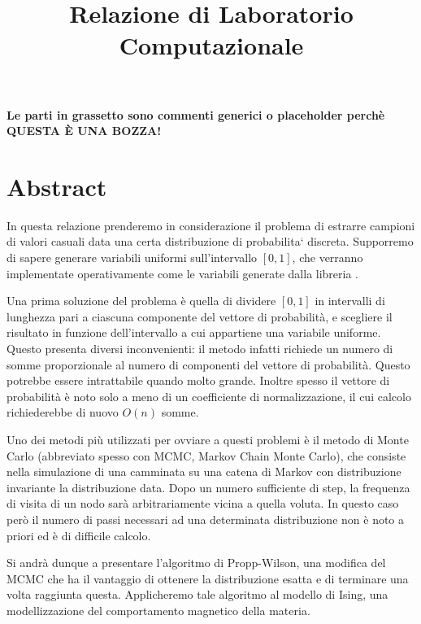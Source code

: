 \documentclass[]{marticle}
\title{\textbf{\Huge Relazione di Laboratorio Computazionale}}
\date{}
\begin{document}
\maketitle

\textbf{Le parti in grassetto sono commenti generici o placeholder perch\`e
QUESTA \`E UNA BOZZA!}

\section*{Abstract}
In questa relazione prenderemo in considerazione il problema di estrarre
campioni di valori casuali data una certa distribuzione di probabilita` discreta.
Supporremo di sapere generare variabili uniformi sull'intervallo $[0,1]$, che
verranno implementate operativamente come le variabili generate dalla libreria
.

Una prima soluzione del problema \`e quella di dividere $[0,1]$ in intervalli di
lunghezza pari a ciascuna componente del vettore di probabilit\`a, e scegliere
il risultato in funzione dell'intervallo a cui appartiene una variabile
uniforme. Questo presenta diversi inconvenienti: il metodo infatti richiede un
numero di somme proporzionale al numero di componenti del vettore di
probabilit\`a. Questo potrebbe essere intrattabile quando molto grande. Inoltre
spesso il vettore di probabilit\`a \`e noto solo a meno di un coefficiente di
normalizzazione, il cui calcolo richiederebbe di nuovo $O(n)$ somme. 

Uno dei metodi pi\`u utilizzati per ovviare a questi problemi \`e il metodo di
Monte Carlo (abbreviato spesso con MCMC, Markov Chain Monte Carlo), che consiste
nella simulazione di una camminata su una catena di Markov con distribuzione
invariante la distribuzione data. Dopo un numero sufficiente di step, la
frequenza di visita di un nodo sar\`a arbitrariamente vicina a quella voluta. In
questo caso per\`o il numero di passi necessari ad una determinata distribuzione
non \`e noto a priori ed \`e di difficile calcolo.

Si andr\`a dunque a presentare l'algoritmo di Propp-Wilson, una modifica del
MCMC che ha il vantaggio di ottenere la distribuzione esatta e di terminare una
volta raggiunta questa. Applicheremo tale algoritmo al modello di Ising, una
modellizzazione del comportamento magnetico della materia.
\end{document}
